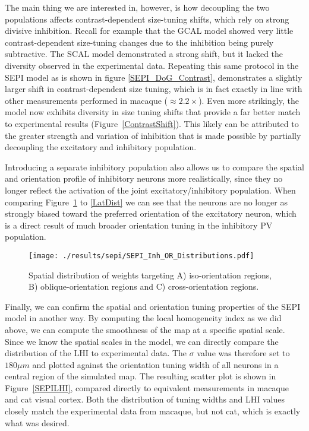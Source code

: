 The main thing we are interested in, however, is how decoupling the
two populations affects contrast-dependent size-tuning shifts, which
rely on strong divisive inhibition. Recall for example that the GCAL
model showed very little contrast-dependent size-tuning changes due to
the inhibition being purely subtractive. The SCAL model demonstrated a
strong shift, but it lacked the diversity observed in the experimental
data. Repeating this same protocol in the SEPI model as is shown in
figure \ref{SEPI_DoG_Contrast}, demonstrates a slightly larger shift
in contrast-dependent size tuning, which is in fact exactly in line
with other measurements performed in macaque ($\approx
2.2\times$). Even more strikingly, the model now exhibits diversity in
size tuning shifts that provide a far better match to experimental
results (Figure~\ref{ContrastShift}). This likely can be attributed to
the greater strength and variation of inhibition that is made possible
by partially decoupling the excitatory and inhibitory population.


Introducing a separate inhibitory population also allows us to compare
the spatial and orientation profile of inhibitory neurons more
realistically, since they no longer reflect the activation of the
joint excitatory/inhibitory population. When comparing
Figure~\ref{SEPI_OR_Distributions} to \ref{LatDist} we can see
that the neurons are no longer as strongly biased toward the preferred
orientation of the excitatory neuron, which is a direct result of much
broader orientation tuning in the inhibitory PV population.

\begin{figure}
	\centering
        \texttt{[image: ./results/sepi/SEPI\_Inh\_OR\_Distributions.pdf]}
	\caption{Spatial distribution of weights targeting A)
      iso-orientation regions, B) oblique-orientation regions and C)
      cross-orientation regions.}
	\label{SEPI_OR_Distributions}
\end{figure}

Finally, we can confirm the spatial and orientation tuning properties
of the SEPI model in another way. By computing the local homogeneity
index as we did above, we can compute the smoothness of the map at a
specific spatial scale. Since we know the spatial scales in the model,
we can directly compare the distribution of the LHI to experimental
data. The $\sigma$ value was therefore set to $180 \mu m$ and plotted
against the orientation tuning width of all neurons in a central
region of the simulated map. The resulting scatter plot is shown in
Figure~\ref{SEPILHI}, compared directly to equivalent measurements in
macaque and cat visual cortex. Both the distribution of tuning widths
and LHI values closely match the experimental data from macaque, but
not cat, which is exactly what was desired.

